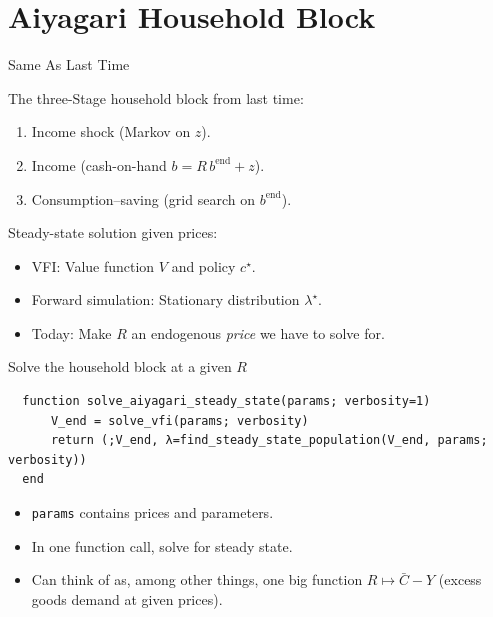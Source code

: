 \documentclass[10pt,aspectratio=169]{beamer}
\begin{document}
\section{Aiyagari Household Block}

\begin{frame}{Same As Last Time}

  The three-Stage household block from last time:
  \begin{enumerate}
    \item Income shock (Markov on $z$).
    \item Income (cash-on-hand $b = R\,b^{\mathrm{end}} + z$).
    \item Consumption--saving (grid search on $b^{\mathrm{end}}$).
  \end{enumerate}

  Steady-state solution given prices:
  \begin{itemize}
    \item VFI: Value function $V$ and policy $c^\star$.
    \item Forward simulation: Stationary distribution $\lambda^\star$.
    \item Today: Make $R$ an endogenous \emph{price} we have to solve for.
  \end{itemize}
\end{frame}

\begin{frame}[fragile]{Solve the household block at a given $R$}
  \begin{lstlisting}
  function solve_aiyagari_steady_state(params; verbosity=1)
      V_end = solve_vfi(params; verbosity)
      return (;V_end, λ=find_steady_state_population(V_end, params; verbosity))
  end
  \end{lstlisting}

  \begin{itemize}
    \item \texttt{params} contains prices and parameters.
    \item In one function call, solve for steady state.
    \item Can think of as, among other things, one big function $R \mapsto \bar C - Y$ (excess goods demand at given prices).
  \end{itemize}
\end{frame}

\end{document}
